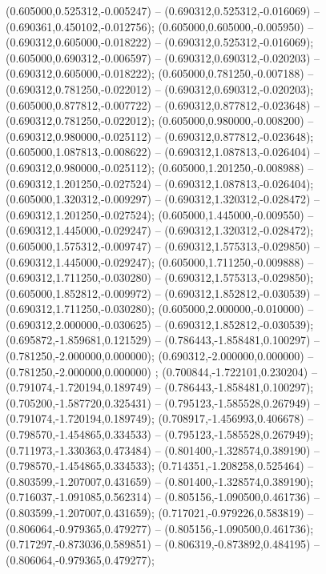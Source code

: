  (0.605000,0.525312,-0.005247) -- (0.690312,0.525312,-0.016069) -- (0.690361,0.450102,-0.012756);
 (0.605000,0.605000,-0.005950) -- (0.690312,0.605000,-0.018222) -- (0.690312,0.525312,-0.016069);
 (0.605000,0.690312,-0.006597) -- (0.690312,0.690312,-0.020203) -- (0.690312,0.605000,-0.018222);
 (0.605000,0.781250,-0.007188) -- (0.690312,0.781250,-0.022012) -- (0.690312,0.690312,-0.020203);
 (0.605000,0.877812,-0.007722) -- (0.690312,0.877812,-0.023648) -- (0.690312,0.781250,-0.022012);
 (0.605000,0.980000,-0.008200) -- (0.690312,0.980000,-0.025112) -- (0.690312,0.877812,-0.023648);
 (0.605000,1.087813,-0.008622) -- (0.690312,1.087813,-0.026404) -- (0.690312,0.980000,-0.025112);
 (0.605000,1.201250,-0.008988) -- (0.690312,1.201250,-0.027524) -- (0.690312,1.087813,-0.026404);
 (0.605000,1.320312,-0.009297) -- (0.690312,1.320312,-0.028472) -- (0.690312,1.201250,-0.027524);
 (0.605000,1.445000,-0.009550) -- (0.690312,1.445000,-0.029247) -- (0.690312,1.320312,-0.028472);
 (0.605000,1.575312,-0.009747) -- (0.690312,1.575313,-0.029850) -- (0.690312,1.445000,-0.029247);
 (0.605000,1.711250,-0.009888) -- (0.690312,1.711250,-0.030280) -- (0.690312,1.575313,-0.029850);
 (0.605000,1.852812,-0.009972) -- (0.690312,1.852812,-0.030539) -- (0.690312,1.711250,-0.030280);
 (0.605000,2.000000,-0.010000) -- (0.690312,2.000000,-0.030625) -- (0.690312,1.852812,-0.030539);
 (0.695872,-1.859681,0.121529) -- (0.786443,-1.858481,0.100297) -- (0.781250,-2.000000,0.000000);
 (0.690312,-2.000000,0.000000) -- (0.781250,-2.000000,0.000000) ;
 (0.700844,-1.722101,0.230204) -- (0.791074,-1.720194,0.189749) -- (0.786443,-1.858481,0.100297);
 (0.705200,-1.587720,0.325431) -- (0.795123,-1.585528,0.267949) -- (0.791074,-1.720194,0.189749);
 (0.708917,-1.456993,0.406678) -- (0.798570,-1.454865,0.334533) -- (0.795123,-1.585528,0.267949);
 (0.711973,-1.330363,0.473484) -- (0.801400,-1.328574,0.389190) -- (0.798570,-1.454865,0.334533);
 (0.714351,-1.208258,0.525464) -- (0.803599,-1.207007,0.431659) -- (0.801400,-1.328574,0.389190);
 (0.716037,-1.091085,0.562314) -- (0.805156,-1.090500,0.461736) -- (0.803599,-1.207007,0.431659);
 (0.717021,-0.979226,0.583819) -- (0.806064,-0.979365,0.479277) -- (0.805156,-1.090500,0.461736);
 (0.717297,-0.873036,0.589851) -- (0.806319,-0.873892,0.484195) -- (0.806064,-0.979365,0.479277);
